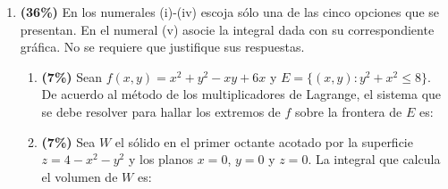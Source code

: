 \documentclass[11pt]{article}
\begin{document}
\begin{enumerate}
\item \textbf{(36\%)} En los numerales (i)-(iv) escoja s\'olo una de las cinco opciones que se presentan. En el numeral (v) asocie la integral dada con su correspondiente gr\'afica. No se requiere que justifique sus respuestas.
\begin{enumerate}
\item \textbf{(7\%)} Sean $f(x,y) = x^2+y^2-xy+6x$ y $E=\{(x,y): y^2+x^2 \le 8\}$. De acuerdo al m\'etodo de los multiplicadores de Lagrange, el sistema que se debe resolver para hallar los extremos de $f$ sobre la frontera de $E$ es:

\item \textbf{(7\%)} Sea $W$ el s\'olido en el primer octante acotado por la superficie $z=4-x^2-y^2$ y los planos $x=0$, $y=0$ y $z=0$. La integral que calcula el volumen de $W$ es:


\end{enumerate}
\end{enumerate}
\end{document}
